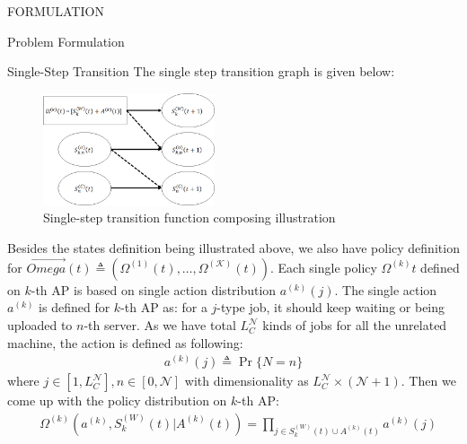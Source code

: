 \documentclass[10pt, conference, letterpaper]{IEEEtran}
\begin{document}
\begin{section}{FORMULATION}
\begin{subsection}{Problem Formulation}
\begin{subsubsection}{Single-Step Transition}
                The single step transition graph is given below:
                \begin{figure}[h]
                    \centering
                    \includegraphics[width=0.45\textwidth]{single-transition.png}
                    \caption{Single-step transition function composing illustration}
                    \label{fig:trans}
                \end{figure}
                Besides the states definition being illustrated above, we also have policy definition for $\vec{Omega}(t) \triangleq (\Omega^{(1)}(t), \dots, \Omega^{(\mathcal{K})}(t))$. Each single policy $\Omega^{(k)}{t}$ defined on $k$-th AP is based on single action distribution $a^{(k)}(j)$.
                The single action $a^{(k)}$ is defined for $k$-th AP as: for a $j$-type job, it should keep waiting or being uploaded to $n$-th server. As we have total $L_C^{\mathcal{N}}$ kinds of jobs for all the unrelated machine, the action is defined as following:
                \begin{align}
                    a^{(k)}(j) \triangleq \Pr\{N=n\}
                \end{align}
                where $j \in [1, L_C^{\mathcal{N}}], n \in [0,\mathcal{N}]$ with dimensionality as $L_C^{\mathcal{N}} \times (\mathcal{N}+1)$. Then we come up with the policy distribution on $k$-th AP:
                \begin{align}
                    & \Omega^{(k)}(a^{(k)}, S^{(W)}_k(t)|A^{(k)}(t))
                    =  \prod_{j \in S^{(W)}_k(t) \cup A^{(k)}(t)} a^{(k)}(j)
                \end{align}


\end{subsubsection}
\end{subsection}
\end{section}
\end{document}
